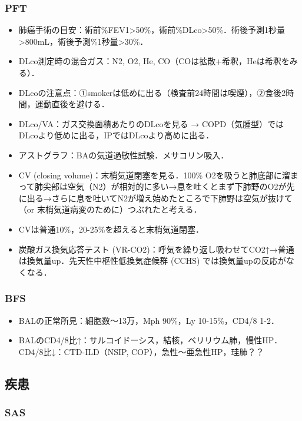 \subsubsection{PFT}

\begin{itemize}

\item 肺癌手術の目安：術前\%FEV1>50\%，術前\%DLco>50\%．術後予測1秒量>800mL，術後予測\%1秒量>30\%．
\item DLco測定時の混合ガス：N2, O2, He, CO（COは拡散+希釈，Heは希釈をみる）．
\item DLcoの注意点：①smokerは低めに出る（検査前24時間は喫煙），②食後2時間，運動直後を避ける．
\item DLco/VA：ガス交換面積あたりのDLcoを見る → COPD（気腫型）ではDLcoより低めに出る，IPではDLcoより高めに出る．
\item アストグラフ：BAの気道過敏性試験．メサコリン吸入．
\item CV (closing volume)：末梢気道閉塞を見る．100\% O2を吸うと肺底部に溜まって肺尖部は空気（N2）が相対的に多い→息を吐くとまず下肺野のO2が先に出る→さらに息を吐いてN2が増え始めたところで下肺野は空気が抜けて（or 末梢気道病変のために）つぶれたと考える．\item CVは普通10\%，20-25\%を超えると末梢気道閉塞．
\item 炭酸ガス換気応答テスト (VR-CO2)：呼気を繰り返し吸わせてCO2↑→普通は換気量up．先天性中枢性低換気症候群 (CCHS) では換気量upの反応がなくなる．

\end{itemize}

\subsubsection{BFS}

\begin{itemize}
\item BALの正常所見：細胞数〜13万，Mph 90\%，Ly 10-15\%，CD4/8 1-2．
\item BALのCD4/8比↑：サルコイドーシス，結核，ベリリウム肺，慢性HP．CD4/8比↓：CTD-ILD（NSIP, COP），急性〜亜急性HP，珪肺？？


\end{itemize}

\subsection{疾患}

\subsubsection{SAS}

